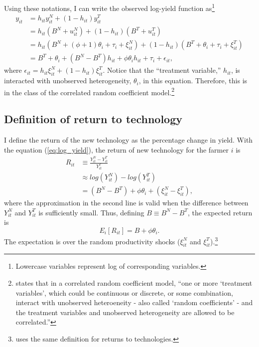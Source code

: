 \documentclass[11pt,letterpaper]{article}
\begin{document}
Using these notations, I can write the observed log-yield function as\footnote{Lowercase variables represent log of corresponding variables.}
\begin{align}\label{eq:log_yield}
  y_{it} &= h_{it} y_{it}^N + (1 - h_{it}) y_{it}^T \nonumber \\
  &= h_{it} (B^N + u_{it}^N) + (1 - h_{it}) (B^T + u_{it}^T) \nonumber \\
  &= h_{it} (B^N + (\phi + 1) \theta_i + \tau_i + \xi_{it}^N) + (1 - h_{it}) (B^T + \theta_i + \tau_i + \xi_{it}^T) \nonumber \\
  &= B^T + \theta_i + (B^N - B^T) h_{it} + \phi \theta_i h_{it} + \tau_i + \epsilon_{it},
\end{align}
where $\epsilon_{it} = h_{it} \xi_{it}^N + (1 - h_{it}) \xi_{it}^T$.
Notice that the ``treatment variable,'' $h_{it}$, is interacted with unobserved heterogeneity, $\theta_i$, in this equation.
Therefore, this is in the class of the correlated random coefficient model.\footnote{
  \cite{Wooldridge03} states that in a correlated random coefficient model, ``one or more `treatment variables', which could be continuous or discrete, or some combination, interact with unobserved heteroeneity - also called `random coefficients' - and the treatment variables and unobserved heterogeneity are allowed to be correlated.''
}

\subsection{Definition of return to technology}

I define the return of the new technology as the percentage change in yield.
With the equation (\ref{eq:log_yield}), the return of new technology for the farmer $i$ is
\begin{align*}
  R_{it} &\equiv \frac{Y_{it}^{N} - Y_{it}^{T}}{Y_{it}^{T}} \\
         &\approx log(Y_{it}^{N}) - log(Y_{it}^{T}) \\
         &= (B^N - B^T) + \phi \theta_i + (\xi_{it}^N - \xi_{it}^T),
\end{align*}
where the approximation in the second line is valid when the difference between $Y_{it}^N$ and $Y_{it}^T$ is sufficiently small.
Thus, defining $B \equiv B^N - B^T$, the expected return is 
\begin{equation*}
  E_i[R_{it}] = B + \phi \theta_i.
\end{equation*}
The expectation is over the random productivity shocks ($\xi_{it}^N$ and $\xi_{it}^T$).\footnote{
  \citet{Suri11} uses the same definition for returns to technologies.
}
\end{document}
